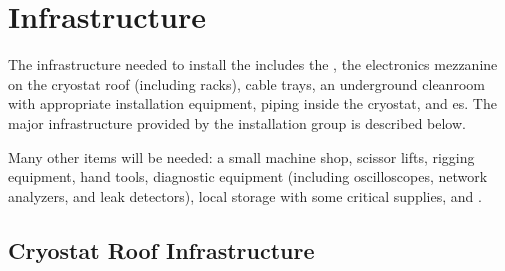 \section{Infrastructure}
\label{sec:fdsp-tc-infr}





The infrastructure needed to install the  includes the , the electronics mezzanine on the cryostat roof (including racks), cable trays, an underground cleanroom with appropriate installation equipment, piping inside the cryostat, and \coldbox{}es. The major infrastructure provided by the installation group is described below.  

Many other items will be needed: a small machine shop, scissor lifts, rigging equipment, hand tools, diagnostic equipment (including oscilloscopes, network analyzers, and leak detectors), local storage with some critical supplies, and .  




\subsection{Cryostat Roof Infrastructure}
\label{sec:fdsp-tc-infr-cryo-roof}



